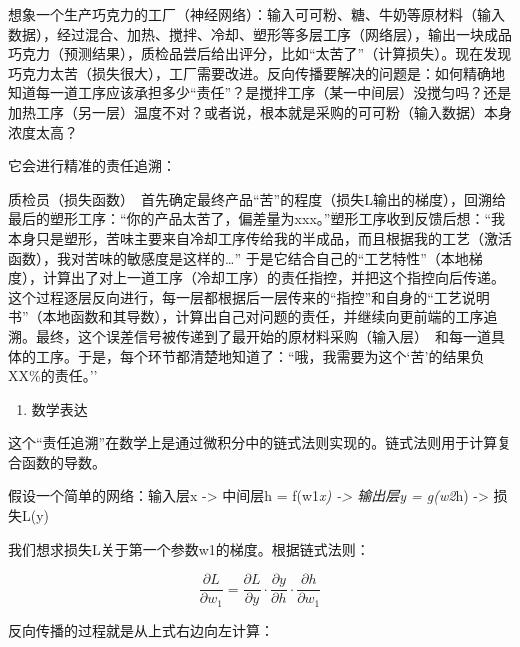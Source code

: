 想象一个生产巧克力的工厂（神经网络）：输入可可粉、糖、牛奶等原材料（输入数据），经过混合、加热、搅拌、冷却、塑形等多层工序（网络层），输出一块成品巧克力（预测结果），质检品尝后给出评分，比如``太苦了''（计算损失）。现在发现巧克力太苦（损失很大），工厂需要改进。反向传播要解决的问题是：如何精确地知道每一道工序应该承担多少``责任''？是搅拌工序（某一中间层）没搅匀吗？还是加热工序（另一层）温度不对？或者说，根本就是采购的可可粉（输入数据）本身浓度太高？

它会进行精准的责任追溯：

质检员（损失函数）~首先确定最终产品``苦''的程度（损失L输出的梯度），回溯给最后的塑形工序：``你的产品太苦了，偏差量为xxx。''塑形工序收到反馈后想：``我本身只是塑形，苦味主要来自冷却工序传给我的半成品，而且根据我的工艺（激活函数），我对苦味的敏感度是这样的\ldots{}'' 于是它结合自己的``工艺特性''（本地梯度），计算出了对上一道工序（冷却工序）的责任指控，并把这个指控向后传递。这个过程逐层反向进行，每一层都根据后一层传来的``指控''和自身的``工艺说明书''（本地函数和其导数），计算出自己对问题的责任，并继续向更前端的工序追溯。最终，这个误差信号被传递到了最开始的原材料采购（输入层）~和每一道具体的工序。于是，每个环节都清楚地知道了：``哦，我需要为这个`苦'的结果负XX\%的责任。''

\begin{enumerate}
\def\labelenumi{\arabic{enumi}.}
\setcounter{enumi}{1}
\tightlist
\item
  数学表达
\end{enumerate}

这个``责任追溯''在数学上是通过微积分中的链式法则实现的。链式法则用于计算复合函数的导数。

假设一个简单的网络：输入层x -\textgreater{} 中间层h = f(w1\emph{x) -\textgreater{} 输出层y = g(w2}h) -\textgreater{} 损失L(y)

我们想求损失L关于第一个参数w1的梯度。根据链式法则：

\[
\frac{\partial L}{\partial w_1}=\frac{\partial L}{\partial y}\cdot\frac{\partial y}{\partial h}\cdot\frac{\partial h}{\partial w_1}
\]

反向传播的过程就是从上式右边向左计算：

